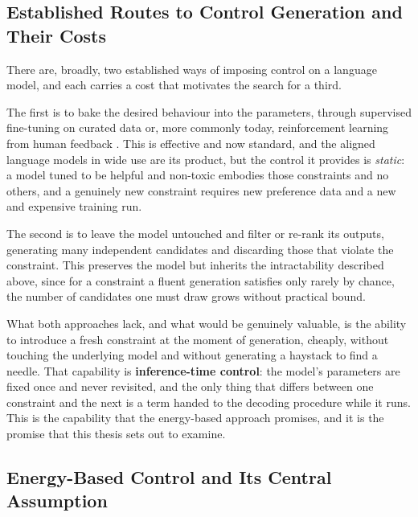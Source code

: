 \subsection{Established Routes to Control Generation and Their Costs}
\label{sec:intro-routes}

There are, broadly, two established ways of imposing control on a language model, and each carries a cost that motivates the search for a third.

The first is to bake the desired behaviour into the parameters, through supervised fine-tuning on curated data or, more commonly today, reinforcement learning from human feedback \citep{ouyang2022training}. This is effective and now standard, and the aligned language models in wide use are its product, but the control it provides is \emph{static}: a model tuned to be helpful and non-toxic embodies those constraints and no others, and a genuinely new constraint requires new preference data and a new and expensive training run.

The second is to leave the model untouched and filter or re-rank its outputs, generating many independent candidates and discarding those that violate the constraint. This preserves the model but inherits the intractability described above, since for a constraint a fluent generation satisfies only rarely by chance, the number of candidates one must draw grows without practical bound.

What both approaches lack, and what would be genuinely valuable, is the ability to introduce a fresh constraint at the moment of generation, cheaply, without touching the underlying model and without generating a haystack to find a needle. That capability is \textbf{inference-time control}: the model's parameters are fixed once and never revisited, and the only thing that differs between one constraint and the next is a term handed to the decoding procedure while it runs. This is the capability that the energy-based approach promises, and it is the promise that this thesis sets out to examine.

\subsection{Energy-Based Control and Its Central Assumption}
\label{sec:intro-ebm}

